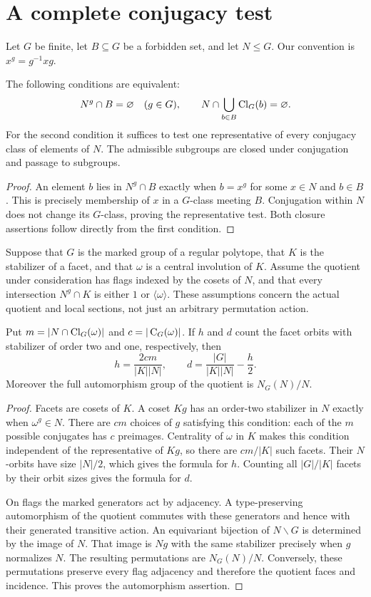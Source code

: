 \section{A complete conjugacy test}
Let $G$ be finite, let $B\subseteq G$ be a forbidden set, and let $N\leq G$. Our convention is $x^g=g^{-1}xg$.
\begin{lemma}\label{avoid}
The following conditions are equivalent:
\[
 N^g\cap B=\varnothing\quad(g\in G),\qquad
 N\cap\bigcup_{b\in B}\operatorname{Cl}_G(b)=\varnothing.
\]
For the second condition it suffices to test one representative of every conjugacy class of elements of $N$. The admissible subgroups are closed under conjugation and passage to subgroups.
\end{lemma}
\begin{proof}
An element $b$ lies in $N^g\cap B$ exactly when $b=x^g$ for some $x\in N$ and $b\in B$. This is precisely membership of $x$ in a $G$-class meeting $B$. Conjugation within $N$ does not change its $G$-class, proving the representative test. Both closure assertions follow directly from the first condition.
\end{proof}

Suppose that $G$ is the marked group of a regular polytope, that $K$ is the stabilizer of a facet, and that $\omega$ is a central involution of $K$. Assume the quotient under consideration has flags indexed by the cosets of $N$, and that every intersection $N^g\cap K$ is either $1$ or $\langle\omega\rangle$. These assumptions concern the actual quotient and local sections, not just an arbitrary permutation action.
\begin{proposition}\label{facets}
Put $m=|N\cap\operatorname{Cl}_G(\omega)|$ and $c=|\operatorname{C}_G(\omega)|$. If $h$ and $d$ count the facet orbits with stabilizer of order two and one, respectively, then
\[
 h=\frac{2cm}{|K||N|},\qquad
 d=\frac{|G|}{|K||N|}-\frac h2.
\]
Moreover the full automorphism group of the quotient is $N_G(N)/N$.
\end{proposition}
\begin{proof}
Facets are cosets of $K$. A coset $Kg$ has an order-two stabilizer in $N$ exactly when $\omega^g\in N$. There are $cm$ choices of $g$ satisfying this condition: each of the $m$ possible conjugates has $c$ preimages. Centrality of $\omega$ in $K$ makes this condition independent of the representative of $Kg$, so there are $cm/|K|$ such facets. Their $N$-orbits have size $|N|/2$, which gives the formula for $h$. Counting all $|G|/|K|$ facets by their orbit sizes gives the formula for $d$.

On flags the marked generators act by adjacency. A type-preserving automorphism of the quotient commutes with these generators and hence with their generated transitive action. An equivariant bijection of $N\backslash G$ is determined by the image of $N$. That image is $Ng$ with the same stabilizer precisely when $g$ normalizes $N$. The resulting permutations are $N_G(N)/N$. Conversely, these permutations preserve every flag adjacency and therefore the quotient faces and incidence. This proves the automorphism assertion.
\end{proof}

